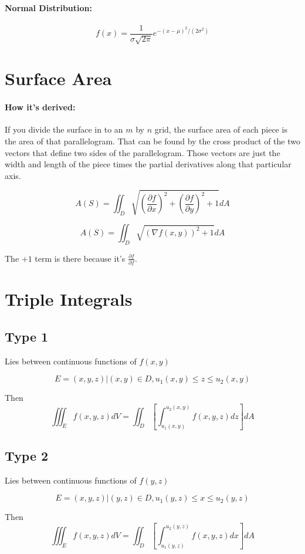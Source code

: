 \documentclass[a4paper,12pt]{report}
\begin{document}
\paragraph{Normal Distribution: } $$f(x) = \frac{1}{\sigma \sqrt{2\pi}} e^{-(x-\mu )^2/(2\sigma^2)}$$

\section{Surface Area}

\paragraph{How it's derived: } If you divide the surface in to an $m$ by $n$ grid, the 
surface area of each piece is the area of that parallelogram. That can be found by 
the cross product of the two vectors that define two sides of the parallelogram. Those 
vectors are just the width and length of the piece times the partial derivatives along 
that particular axis. 

$$A(S) = \iint_D \sqrt{(\frac{\partial f}{\partial x})^2 
                     + (\frac{\partial f}{\partial y})^2 + 1} dA$$

$$A(S) = \iint_D \sqrt{(\nabla f(x, y))^2 + 1} dA$$

The $+ 1$ term is there because it's $\frac{\partial f}{\partial f}$.

\section{Triple Integrals}
\subsection{Type 1}
Lies between continuous functions of $f(x, y)$

$$E = {(x, y, z) | (x, y) \in D, u_1(x, y) \leq z \leq u_2(x, y) }$$

Then $$\iiint_E f(x, y, z) dV = \iint_D [\int_{u_1(x, y)}^{u_2(x, y)} f(x, y, z) dz] dA$$

\subsection{Type 2}
Lies between continuous functions of $f(y, z)$

$$E = {(x, y, z) | (y, z) \in D, u_1(y, z) \leq x \leq u_2(y, z) }$$

Then $$\iiint_E f(x, y, z) dV = \iint_D [\int_{u_1(y, z)}^{u_2(y, z)} f(x, y, z) dx] dA$$
\end{document}
